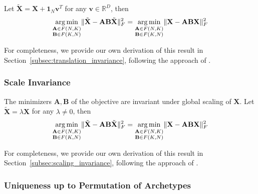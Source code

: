 \documentclass{article}
\DeclareMathOperator*{\argmin}{arg\,min}
\begin{document}
Let $\tilde{\mathbf{X}} = \mathbf{X} + \mathbf{1}_N \mathbf{v}^T$ for any $\mathbf{v} \in \mathbb{R}^D$, then
\begin{equation}
    \underset{\begin{subarray}{c} \mathbf{A} \in F(N, K) \\ \mathbf{B} \in F(K, N) \end{subarray}}{\argmin} \| \tilde{\mathbf{X}} - \mathbf{A} \mathbf{B} \tilde{\mathbf{X}} \|_F^2
    =
    \underset{\begin{subarray}{c} \mathbf{A} \in F(N, K) \\ \mathbf{B} \in F(K, N) \end{subarray}}{\argmin} \| \mathbf{X} - \mathbf{A} \mathbf{B} \mathbf{X}\|_F^2
\end{equation}

For completeness, we provide our own derivation of this result in Section~\ref{subsec:translation_invariance}, following the approach of \textcite{morupArchetypalAnalysisMachine2012}.

\subsubsection{Scale Invariance}
\label{subsubsec:scale_invariance}

The minimizers $\mathbf{A}, \mathbf{B}$ of the objective are invariant under global scaling of $\mathbf{X}$. Let $\tilde{\mathbf{X}} = \lambda \mathbf{X}$ for any $\lambda \neq 0$, then
\begin{equation}
    \underset{\begin{subarray}{c} \mathbf{A} \in F(N, K) \\ \mathbf{B} \in F(K, N) \end{subarray}}{\argmin} \| \tilde{\mathbf{X}} - \mathbf{A} \mathbf{B} \tilde{\mathbf{X}} \|_F^2
    =
    \underset{\begin{subarray}{c} \mathbf{A} \in F(N, K) \\ \mathbf{B} \in F(K, N) \end{subarray}}{\argmin} \| \mathbf{X} - \mathbf{A} \mathbf{B} \mathbf{X}\|_F^2
\end{equation}

For completeness, we provide our own derivation of this result in Section~\ref{subsec:scaling_invariance}, following the approach of \textcite{morupArchetypalAnalysisMachine2012}.

\subsubsection{Uniqueness up to Permutation of Archetypes}
\end{document}
